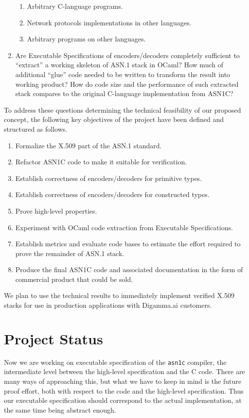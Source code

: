 \documentclass[acmsmall,nonacm]{acmart}
\begin{document}
\begin{enumerate}
\begin{enumerate}
    \item Arbitrary C-language programs.
    \item Network protocols implementations in other languages.
    \item Arbitrary programs on other languages.
    \end{enumerate}
  \item Are Executable Specifications of encoders/decoders completely sufficient to “extract” a working skeleton of ASN.1 stack in OCaml? How much of additional “glue” code needed to be written to transform the result into working product? How do code size and the performance of such extracted stack compares to the original C-language implementation from ASN1C?  
\end{enumerate}

To address these questions determining the technical feasibility of
our proposed concept, the following key objectives of the project have
been defined and structured as follows.

\begin{enumerate}
\item Formalize the X.509 part of the ASN.1 standard.     
\item Refactor ASN1C code to make it suitable for verification.
\item Establish correctness of encoders/decoders for primitive types.
\item Establish correctness of encoders/decoders for constructed types.
\item Prove high-level properties.
\item Experiment with OCaml code extraction from Executable Specifications.
\item Establish metrics and evaluate code bases to estimate the effort required to prove the remainder of ASN.1 stack.
\item Produce the final ASN1C code and associated documentation in the form of commercial product that could be sold.
\end{enumerate}

We plan to use the technical results to immediately implement verified
X.509 stacks for use in production applications with Digamma.ai
customers.
 
\section{Project Status}

Now we are working on executable specification of the \texttt{asn1c} compiler, the intermediate level between the high-level specification and the C code. There are many ways of approaching this, but what we have to keep in mind is the future proof effort, both with respect to the code and the high-level specification. Thus our executable specification should correspond to the actual implementation, at the same time being abstract enough.
\end{document}
